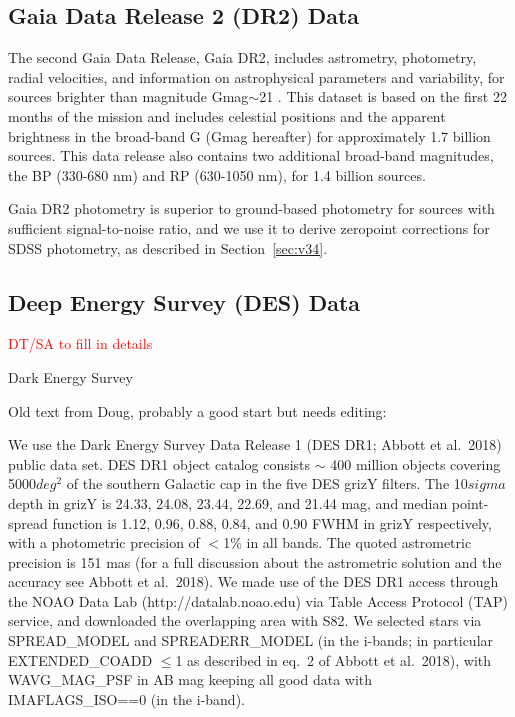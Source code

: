 \documentclass{aastex63}
\newcommand{\tbd}[1]{\textcolor{red}{#1}} %
\begin{document}
\subsection{Gaia Data Release 2 (DR2) Data} \label{ssec:gaia}
 
The second Gaia Data Release, Gaia DR2, includes astrometry, photometry, radial velocities, and information on astrophysical parameters and variability, for sources brighter than magnitude Gmag$\sim$21 \citep{2018A&A...616A...1G}. This dataset
is based on the first 22 months of the mission and includes celestial positions and the apparent brightness in the broad-band G (Gmag hereafter) for approximately 1.7 billion sources. This data release also contains two additional broad-band magnitudes, the BP (330-680 nm) and RP (630-1050 nm), for 1.4 billion sources.
    
Gaia DR2 photometry is superior to ground-based photometry for sources with sufficient signal-to-noise ratio, and we use 
it to derive zeropoint corrections for SDSS photometry, as described in Section~\ref{sec:v34}. 


\subsection{Deep Energy Survey (DES) Data} \label{ssec:des}

\tbd{DT/SA to fill in details}
 
Dark Energy Survey \citep{2016MNRAS.460.1270D}

Old text from Doug, probably a good start but needs editing: 

We use the Dark Energy Survey Data Release 1 (DES DR1; Abbott et al.\ 2018) public data set. DES DR1 object catalog consists $\sim$ 400 million objects covering 5000$deg^{2}$ of the southern Galactic cap in the five DES grizY filters. The 10$sigma$ depth in grizY is 24.33, 24.08, 23.44, 22.69, and 21.44 mag, and median point-spread function is 1.12, 0.96, 0.88, 0.84, and 0.90 FWHM in grizY respectively, with a photometric precision of $<$1\% in all bands. The quoted astrometric precision is 151 mas (for a full discussion about the astrometric solution and the accuracy see Abbott et al.\ 2018). We made use of the DES DR1 access through the NOAO Data Lab (http://datalab.noao.edu) via Table Access Protocol (TAP) service, and downloaded the overlapping area with S82. We selected stars via SPREAD\_MODEL and SPREADERR\_MODEL (in the i-bands; in particular EXTENDED\_COADD $\leq$1 as described in eq.~2 of Abbott et al.\ 2018), with WAVG\_MAG\_PSF in AB mag keeping all good data with IMAFLAGS\_ISO==0 (in the i-band).
\end{document}
